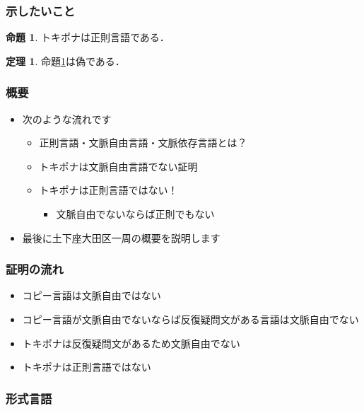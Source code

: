 \documentclass[14pt]{beamer}
\theoremstyle{definition}
\newtheorem{thm}{定理}
\newtheorem{prop}{命題}
\begin{document}
\begin{frame}
	\frametitle{示したいこと}

	\begin{tcolorbox}[
			colframe=orange!80,
			colback=orange!20,
			sharp corners]
		\begin{prop}\label{prop:pona}
			トキポナは正則言語である．
		\end{prop}

		\begin{thm}
			命題\ref{prop:pona}は偽である．
		\end{thm}
	\end{tcolorbox}

\end{frame}


\begin{frame}
	\frametitle{概要}

	\begin{itemize}
		\item 次のような流れです
			\begin{itemize}
				\item 正則言語・文脈自由言語・文脈依存言語とは？
				\item トキポナは文脈自由言語でない証明
				\item トキポナは正則言語ではない！
					\begin{itemize}
						\item 文脈自由でないならば正則でもない
					\end{itemize}
			\end{itemize}
		\item 最後に土下座大田区一周の概要を説明します
	\end{itemize}

\end{frame}


\begin{frame}
	\frametitle{証明の流れ}

	\begin{itemize}
		\item コピー言語は文脈自由ではない
		\item コピー言語が文脈自由でないならば反復疑問文がある言語は文脈自由でない
		\item トキポナは反復疑問文があるため文脈自由でない
		\item トキポナは正則言語ではない
	\end{itemize}

\end{frame}


\begin{frame}
	\frametitle{形式言語}
\end{frame}
\end{document}
